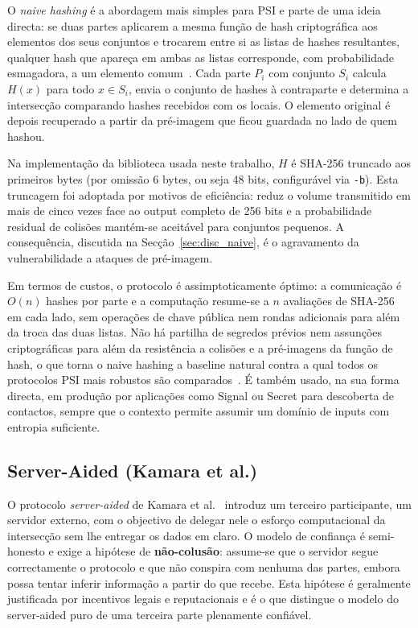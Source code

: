 O \emph{naive hashing} é a abordagem mais simples para PSI e parte de uma ideia directa: se duas partes aplicarem a mesma função de hash criptográfica aos elementos dos seus conjuntos e trocarem entre si as listas de hashes resultantes, qualquer hash que apareça em ambas as listas corresponde, com probabilidade esmagadora, a um elemento comum~\cite{pinkas2016scalable}. Cada parte $P_i$ com conjunto $S_i$ calcula $H(x)$ para todo $x \in S_i$, envia o conjunto de hashes à contraparte e determina a intersecção comparando hashes recebidos com os locais. O elemento original é depois recuperado a partir da pré-imagem que ficou guardada no lado de quem hashou.

Na implementação da biblioteca usada neste trabalho, $H$ é SHA-256 truncado aos primeiros bytes (por omissão 6 bytes, ou seja 48 bits, configurável via \texttt{-b}). Esta truncagem foi adoptada por motivos de eficiência: reduz o volume transmitido em mais de cinco vezes face ao output completo de 256 bits e a probabilidade residual de colisões mantém-se aceitável para conjuntos pequenos. A consequência, discutida na Secção~\ref{sec:disc_naive}, é o agravamento da vulnerabilidade a ataques de pré-imagem.

Em termos de custos, o protocolo é assimptoticamente óptimo: a comunicação é $O(n)$ hashes por parte e a computação resume-se a $n$ avaliações de SHA-256 em cada lado, sem operações de chave pública nem rondas adicionais para além da troca das duas listas. Não há partilha de segredos prévios nem assunções criptográficas para além da resistência a colisões e a pré-imagens da função de hash, o que torna o naive hashing a baseline natural contra a qual todos os protocolos PSI mais robustos são comparados~\cite{pinkas2016scalable}. É também usado, na sua forma directa, em produção por aplicações como Signal ou Secret para descoberta de contactos, sempre que o contexto permite assumir um domínio de inputs com entropia suficiente.

\subsection{Server-Aided (Kamara et al.)}
\label{sec:serveraided}

O protocolo \emph{server-aided} de Kamara et al.~\cite{kamara2014scaling} introduz um terceiro participante, um servidor externo, com o objectivo de delegar nele o esforço computacional da intersecção sem lhe entregar os dados em claro. O modelo de confiança é semi-honesto e exige a hipótese de \textbf{não-colusão}: assume-se que o servidor segue correctamente o protocolo e que não conspira com nenhuma das partes, embora possa tentar inferir informação a partir do que recebe. Esta hipótese é geralmente justificada por incentivos legais e reputacionais e é o que distingue o modelo do server-aided puro de uma terceira parte plenamente confiável.

